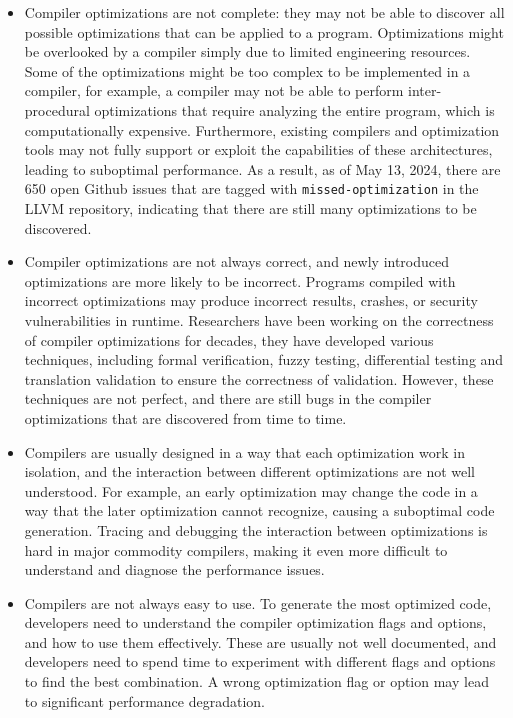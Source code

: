 \begin{itemize}

    \item Compiler optimizations are not complete: they may not be
able to discover all possible optimizations that can be applied to a
program.
%
Optimizations might be overlooked by a compiler simply due to limited
engineering resources.
%
Some of the optimizations might be too complex to be implemented in a
compiler, for example, a compiler may not be able to perform
inter-procedural optimizations that require analyzing the entire
program, which is computationally expensive.
%
Furthermore, existing compilers and optimization tools may not fully
support or exploit the capabilities of these architectures, leading to
suboptimal performance.
%
As a result, as of May 13, 2024, there are 650 open Github issues
that are tagged with \texttt{missed-optimization} in the LLVM repository,
indicating that there are still many optimizations to be discovered.


\item Compiler optimizations are not always correct, and newly
introduced optimizations are more likely to be incorrect. Programs
compiled with incorrect optimizations may produce incorrect results,
crashes, or security vulnerabilities in runtime.
%
Researchers have been working on the correctness of
compiler optimizations for decades, they have developed various
techniques, including formal verification, fuzzy testing, differential
testing and translation validation to ensure the correctness of
validation.
%
However, these techniques are not perfect, and there are
still bugs in the compiler optimizations that are discovered from time
to time.


\item Compilers are usually designed in a way that each optimization
work in isolation, and the interaction between different optimizations
are not well understood.
%
For example, an early optimization may change the code in a way that
the later optimization cannot recognize, causing a suboptimal code
generation.
%
Tracing and debugging the interaction between optimizations is hard in
major commodity compilers, making it even more difficult to understand
and diagnose the performance issues.

\item Compilers are not always easy to use. To generate the most
optimized code, developers need to understand the compiler
optimization flags and options, and how to use them effectively.
%
These are usually not well documented, and developers need to spend
time to experiment with different flags and options to find the best
combination.
%
A wrong optimization flag or option may lead to significant
performance degradation.

\end{itemize}

